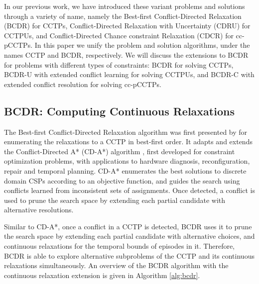 \documentclass[jair,twoside,11pt,theapa]{article}
\begin{document}
%
%
%

%
%


In our previous work, we have introduced these variant problems and solutions
through a variety of name, namely the Best-first Conflict-Directed Relaxation
(BCDR) \cite{Yu_BCDR_2013} for CCTPs, Conflict-Directed Relaxation with
Uncertainty (CDRU) \cite{Yu_CDRU_2014} for CCTPUs, and Conflict-Directed Chance
constraint Relaxation (CDCR) \cite{Yu_AAAI_2015} for cc-pCCTPs. In this paper we
unify the problem and solution algorithms, under the names CCTP and BCDR,
respectively. We will discuss the extensions to BCDR for problems with different
types of constraints: BCDR for solving CCTPs, BCDR-U with extended conflict
learning for solving CCTPUs, and BCDR-C with extended conflict resolution for
solving cc-pCCTPs.


\subsection{BCDR: Computing Continuous Relaxations}


The Best-first Conflict-Directed Relaxation algorithm was first presented by
 for enumerating the relaxations to a CCTP in best-first
order. It adapts and extends the Conflict-Directed A* (CD-A*) algorithm
\cite{Williams_CDAstar_2002}, first developed for constraint optimization problems,
with applications to hardware diagnosis, reconfiguration, repair and temporal
planning. CD-A* enumerates the best solutions to discrete domain CSPs according
to an objective function, and guides the search using conflicts learned from
inconsistent sets of assignments. Once detected, a conflict is used to prune the
search space by extending each partial candidate with alternative resolutions.

Similar to CD-A*, once a conflict in a CCTP is detected, BCDR uses it to prune
the search space by extending each partial candidate with alternative choices,
and continuous relaxations for the temporal bounds of episodes in it. Therefore,
BCDR is able to explore alternative subproblems of the CCTP and its continuous
relaxations simultaneously. An overview of the BCDR algorithm with the
continuous relaxation extension is given in Algorithm \ref{alg:bcdr}.
\end{document}
